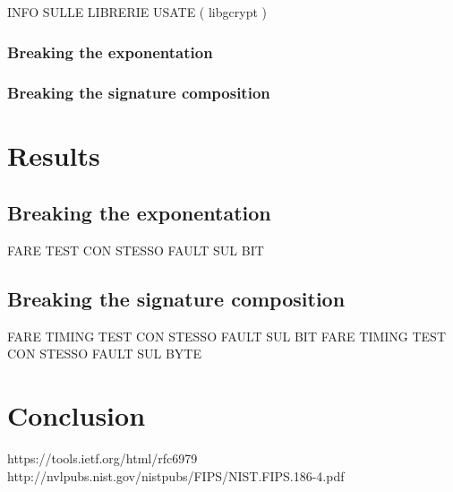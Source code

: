 \documentclass[11pt,english]{article}
\begin{document}
INFO SULLE LIBRERIE USATE ( libgcrypt ) 

\subsubsection{Breaking the exponentation}

\subsubsection{Breaking the signature composition}

\section{Results}

\subsection{Breaking the exponentation}

FARE TEST CON STESSO FAULT SUL BIT

\subsection{Breaking the signature composition}

FARE TIMING TEST CON STESSO FAULT SUL BIT
FARE TIMING TEST CON STESSO FAULT SUL BYTE 

\section{Conclusion}

\begin{thebibliography}{10}
 https://tools.ietf.org/html/rfc6979
 http://nvlpubs.nist.gov/nistpubs/FIPS/NIST.FIPS.186-4.pdf

\end{thebibliography}
\end{document}
